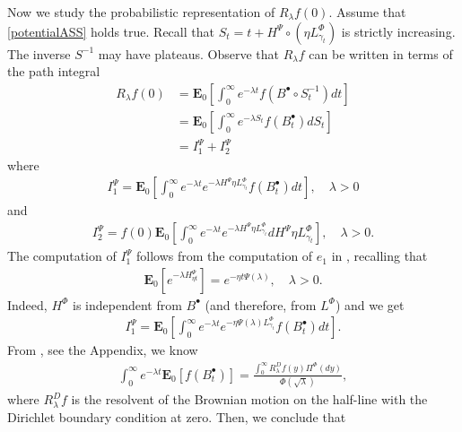 \documentclass[11pt,a4paper]{article}
\theoremstyle{plain}
\theoremstyle{definition}
\theoremstyle{remark}
\begin{document}
		Now we study the probabilistic representation of $R_\lambda f(0)$. Assume that \eqref{potentialASS} holds true. Recall that $S_t = t + H^\Psi \circ (\eta L^\Phi_{\gamma_t})$ is strictly increasing. The inverse $S^{-1}$ may have plateaus. Observe that $R_\lambda f$ can be written in terms of the path integral
		\begin{align*}
			R_\lambda f(0) 
			& = \mathbf{E}_0\left[\int_0^\infty e^{-\lambda t} f(B^\bullet \circ S_t^{-1}) dt\right]\\
			& = \mathbf{E}_0\left[\int_0^\infty e^{-\lambda S_t} f(B^\bullet_t) dS_t\right]\\ 
			& = I_1^\Psi+I_2^\Psi
		\end{align*}
		where 
		\begin{align*}
			I_1^\Psi = \mathbf{E}_0\left[\int_0^\infty e^{-\lambda t}e^{- \lambda H^\Psi\eta  L^\Phi_{\gamma_t}} f(B^\bullet_t) dt\right], \quad \lambda>0
		\end{align*}
		and
		\begin{align*}
			I_2^\Psi = f(0) \mathbf{E}_0\left[\int_0^\infty e^{-\lambda t} e^{-\lambda H^\Psi\eta  L^\Phi_{\gamma_t}} dH^\Psi \eta L^\Phi_{\gamma_t}\right], \quad \lambda>0.
		\end{align*}
		The computation of $I_1^\Psi$ follows from the computation of $e_1$ in \cite[page 215]{ito1963brownian}, recalling that 
		\begin{align*}
			\mathbf{E}_0[e^{-\lambda H^\Psi_{\eta t}}]=e^{-\eta t \Psi(\lambda)}, \quad \lambda>0.
		\end{align*}
		Indeed, $H^\Phi$ is independent from $B^\bullet$ (and therefore, from $L^\Phi$) and we get
		\begin{align*}
			I^\Psi_1 
			= \mathbf{E}_0\left[\int_0^\infty e^{-\lambda t} e^{- \eta \Psi(\lambda)  L^\Phi_{\gamma_t}} f(B^\bullet_t) dt\right].
		\end{align*}
		From  \cite[Formula 6, Section 15]{ito1963brownian}, see the Appendix, we know 
		\begin{align*}
			\int_0^\infty e^{-\lambda t} \mathbf{E}_0[f(B^\bullet_t)]= \frac{\int_0^\infty {R}_\lambda^D f(y) \Pi^\Phi(dy)}{\Phi(\sqrt{\lambda})},
		\end{align*}
		where \({R}_\lambda^D f\) is the resolvent of the Brownian motion on the half-line with the Dirichlet boundary condition at zero. Then, we conclude that
\end{document}
